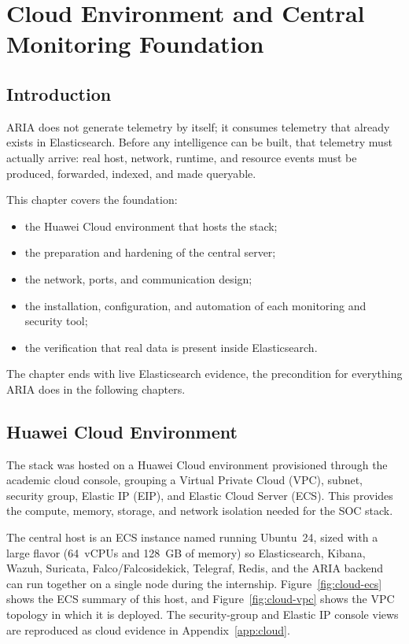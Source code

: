 \chapter{Cloud Environment and Central Monitoring Foundation}

\section{Introduction}

ARIA does not generate telemetry by itself; it consumes telemetry that already exists in Elasticsearch. Before any intelligence can be built, that telemetry must actually arrive: real host, network, runtime, and resource events must be produced, forwarded, indexed, and made queryable.

This chapter covers the foundation:

\begin{itemize}[leftmargin=1cm]
\item the Huawei Cloud environment that hosts the stack;
\item the preparation and hardening of the central server;
\item the network, ports, and communication design;
\item the installation, configuration, and automation of each monitoring and security tool;
\item the verification that real data is present inside Elasticsearch.
\end{itemize}

The chapter ends with live Elasticsearch evidence, the precondition for everything ARIA does in the following chapters.

\section{Huawei Cloud Environment}

The stack was hosted on a Huawei Cloud environment provisioned through the academic cloud console, grouping a Virtual Private Cloud (VPC), subnet, security group, Elastic IP (EIP), and Elastic Cloud Server (ECS). This provides the compute, memory, storage, and network isolation needed for the SOC stack.


The central host is an ECS instance named  running Ubuntu~24, sized with a large flavor (64~vCPUs and 128~GB of memory) so Elasticsearch, Kibana, Wazuh, Suricata, Falco/Falcosidekick, Telegraf, Redis, and the ARIA backend can run together on a single node during the internship. Figure~\ref{fig:cloud-ecs} shows the ECS summary of this host, and Figure~\ref{fig:cloud-vpc} shows the VPC topology in which it is deployed. The security-group and Elastic IP console views are reproduced as cloud evidence in Appendix~\ref{app:cloud}.

